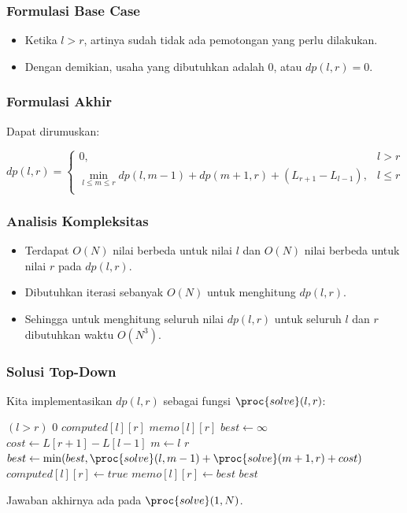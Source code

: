 \begin{frame} 
\frametitle{Formulasi Base Case}
\begin{itemize}
  \item Ketika $l>r$, artinya sudah tidak ada pemotongan yang perlu dilakukan.
  \item Dengan demikian, usaha yang dibutuhkan adalah 0, atau $dp(l,r) = 0$.
\end{itemize}
\end{frame}

\begin{frame} 
\frametitle{Formulasi Akhir}
Dapat dirumuskan:
\begin{small}
\[dp(l,r) = \left\{\begin{array}{lr}
    0, & l>r\\
    \min_{l \leq m \leq r} dp(l,m-1) + dp(m+1,r) + (L_{r+1} - L_{l-1}), & l \leq r \\
    \end{array}\right.\]
\end{small}
\end{frame}

\begin{frame} 
\frametitle{Analisis Kompleksitas}
\begin{itemize}
  \item Terdapat $O(N)$ nilai berbeda untuk nilai $l$ dan $O(N)$ nilai berbeda untuk nilai $r$ pada $dp(l,r)$.
  \item Dibutuhkan iterasi sebanyak $O(N)$ untuk menghitung $dp(l,r)$. 
  \item Sehingga untuk menghitung seluruh nilai $dp(l,r)$ untuk seluruh $l$ dan $r$ dibutuhkan waktu $O(N^3)$.
\end{itemize}
\end{frame}

\begin{frame}
\frametitle{Solusi Top-Down}
Kita implementasikan $dp(l, r)$ sebagai fungsi $\proc{solve}(l,r)$:
\begin{small}
\begin{codebox}
\li \If $(l > r)$ \Then
\li   \Return $0$
   \End
\li \If $computed[l][r]$ \Then
\li   \Return $memo[l][r]$ 
\li \End
\li $best \gets \infty$
\li $cost \gets L[r+1] - L[l-1]$
\li \For $m \gets l$ \To $r$ \Do
\li   $best \gets \min(best, \proc{solve}(l,m-1) + \proc{solve}(m+1, r) + cost)$
    \End  
\li $computed[l][r] \gets true$
\li $memo[l][r] \gets best$
\li \Return $best$
\end{codebox}
\end{small}
Jawaban akhirnya ada pada $\proc{solve}(1, N)$.
\end{frame}

